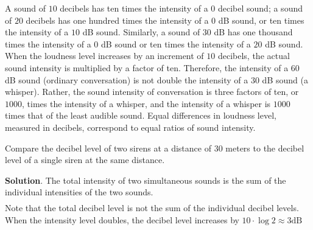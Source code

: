 \documentclass[10pt,]{book}
\theoremstyle{ptxdefinitionnotitle}
\theoremstyle{ptxdefinitiontitle}
\theoremstyle{ptxdefinitionnotitle}
\theoremstyle{ptxdefinitiontitle}
\theoremstyle{ptxdefinitionnotitle}
\theoremstyle{ptxdefinitiontitle}
\numberwithin{equation}{section}
\begin{document}
\hypertarget{p-310}{}%
A sound of \(10\) decibels has ten times the intensity of a \(0\) decibel sound; a sound of \(20\) decibels has one hundred times the intensity of a \(0\) dB sound, or ten times the intensity of a \(10\) dB sound. Similarly, a sound of \(30\) dB has one thousand times the intensity of a \(0\) dB sound or ten times the intensity of a \(20\) dB sound.  When the loudness level increases by an increment of \(10\) decibels, the actual sound intensity is multiplied by a factor of ten.  Therefore, the intensity of a \(60\) dB sound (ordinary conversation) is not double the intensity of a \(30\) dB sound (a whisper).  Rather, the sound intensity of conversation is three factors of ten, or \(1000\), times the intensity of a whisper, and the intensity of a whisper is \(1000\) times that of the least audible sound.  Equal differences in loudness level, measured in decibels, correspond to equal ratios of sound intensity.%
\begin{example}\label{example-24}
\hypertarget{p-311}{}%
Compare the decibel level of two sirens at a distance of \(30\) meters to the decibel level of a single siren at the same distance.%
\par\smallskip%
\noindent\textbf{Solution}.\hypertarget{solution-24}{}\quad%
\hypertarget{p-312}{}%
The total intensity of two simultaneous sounds is the sum of the individual intensities of the two sounds.%
\begin{align*}
\end{align*}
Note that the total decibel level is not the sum of the individual decibel levels.  When the intensity level doubles, the decibel level increases by \(10\cdot\log2 \approx 3 \text{dB}\)%
\end{example}
\typeout{************************************************}
\typeout{************************************************}
\end{document}
